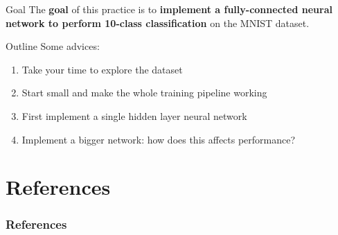 \documentclass[aspectratio=169]{beamer}
\begin{document}
\begin{frame}{Goal}
The \textbf{goal} of this practice is to \textbf{implement a fully-connected neural network to perform 10-class classification} on the MNIST dataset.
\end{frame}



\begin{frame}{Outline}
Some advices:
\begin{enumerate}
\item Take your time to explore the dataset
\item Start small and make the whole training pipeline working
\item First implement a single hidden layer neural network
\item Implement a bigger network: how does this affects performance?
\end{enumerate}
\end{frame}



\section{References}

\begin{frame}[t, allowframebreaks]
\frametitle{References}


\end{frame}
\end{document}
